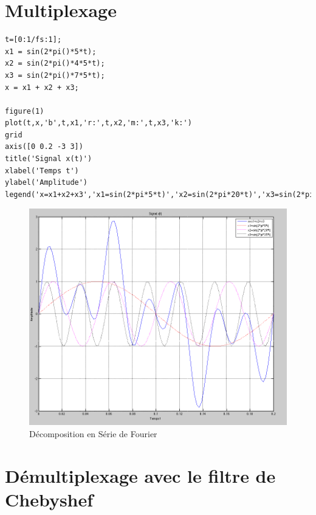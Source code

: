 \documentclass[a4paper, oneside]{report}
\begin{document}
 
 \chapter{Multiplexage}
 
\begin{lstlisting}
t=[0:1/fs:1];
x1 = sin(2*pi()*5*t);
x2 = sin(2*pi()*4*5*t);
x3 = sin(2*pi()*7*5*t);
x = x1 + x2 + x3;

figure(1)
plot(t,x,'b',t,x1,'r:',t,x2,'m:',t,x3,'k:')
grid
axis([0 0.2 -3 3])
title('Signal x(t)')
xlabel('Temps t')
ylabel('Amplitude') 
legend('x=x1+x2+x3','x1=sin(2*pi*5*t)','x2=sin(2*pi*20*t)','x3=sin(2*pi*35*t)')
\end{lstlisting}

 \begin{figure}[h]
 \centering
 \includegraphics[scale=0.5]{images/xt.png}
 \caption{D\'ecomposition en S\'erie de Fourier}
 \end{figure}
 	  
  \chapter{D\'emultiplexage avec le filtre de Chebyshef}
 		
\end{document}
